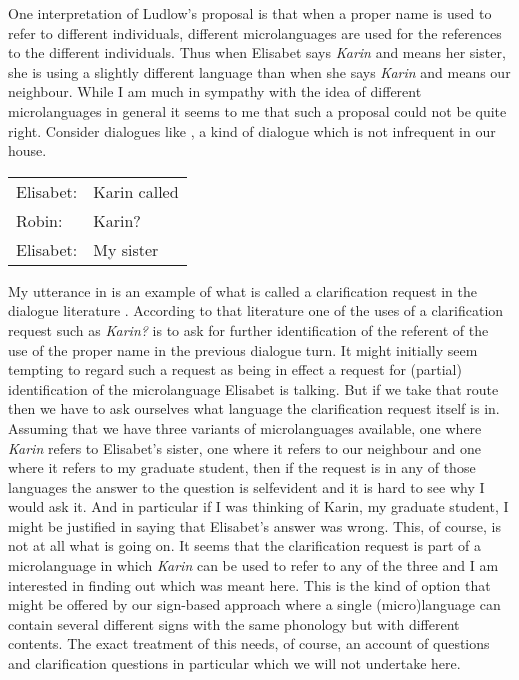 One interpretation of Ludlow's proposal is that when a proper name is
used to refer to different individuals, different microlanguages
are used for the references to the different individuals.  Thus when
Elisabet says \textit{Karin} and means her sister, she is using a
slightly different language than when she says \textit{Karin} and means
our neighbour. While I am much in sympathy with the idea of different
microlanguages in general it seems to me that such a proposal could
not be quite right.  Consider dialogues like \nexteg{}, a kind of
dialogue which is not infrequent in our house.
\begin{ex} 
\begin{tabular}[t]{ll}
Elisabet: & Karin called \\
Robin: & Karin? \\
Elisabet: & My sister
\end{tabular} 
\end{ex} 
My utterance in \preveg{} is an example of what is called a
clarification request in the dialogue
literature \citep[and much other
literature]{GinzburgCooper2004,Ginzburg2012}.  According to that
literature one of the uses of a clarification request such as
\textit{Karin?} is to ask for further identification of the referent
of the use of the proper name in the previous dialogue turn.  It might
initially seem tempting to regard such a request as being in effect a
request for (partial) identification of the microlanguage Elisabet is
talking.  But if we take that route then we have to ask ourselves what
language the clarification request itself is in.  Assuming that we
have three variants of microlanguages available, one where
\textit{Karin} refers to Elisabet's sister, one where it refers to our
neighbour and one where it refers to my graduate student, then if the
request is in any of those languages the answer to the question is
selfevident and it is hard to see why I would ask it.  And in
particular if I was thinking of Karin, my graduate student, I might be
justified in saying that Elisabet's answer was wrong.  This, of
course, is not at all what is going on.  It seems that the
clarification request is part of a microlanguage in which
\textit{Karin} can be used to refer to any of the three and I am
interested in finding out which was meant here.  This is the kind of
option that might be offered by our sign-based approach where a single
(micro)language can contain several different signs with the same
phonology but with different contents.  The exact treatment of this
needs, of course, an account of questions and clarification questions
in particular which we will not undertake here.

